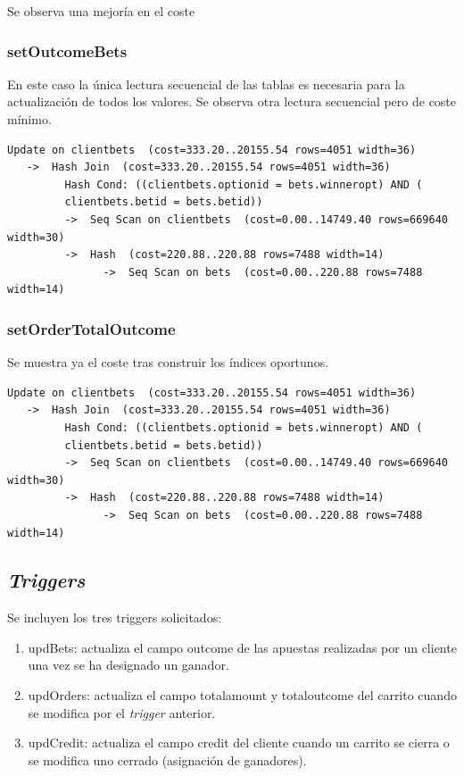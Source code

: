 \documentclass{article}
\begin{document}
Se observa una mejoría en el coste %

\subsubsection{setOutcomeBets}

En este caso la única lectura secuencial de las tablas es necesaria para la actualización de todos los valores. Se observa otra lectura secuencial pero de coste mínimo.

\begin{lstlisting}[style=sql]
 Update on clientbets  (cost=333.20..20155.54 rows=4051 width=36)
   ->  Hash Join  (cost=333.20..20155.54 rows=4051 width=36)
         Hash Cond: ((clientbets.optionid = bets.winneropt) AND (
         clientbets.betid = bets.betid))
         ->  Seq Scan on clientbets  (cost=0.00..14749.40 rows=669640 width=30)
         ->  Hash  (cost=220.88..220.88 rows=7488 width=14)
               ->  Seq Scan on bets  (cost=0.00..220.88 rows=7488 width=14)
\end{lstlisting}

\subsubsection{setOrderTotalOutcome}

Se muestra ya el coste tras construir los índices oportunos.
\begin{lstlisting}[style=sql]
 Update on clientbets  (cost=333.20..20155.54 rows=4051 width=36)
   ->  Hash Join  (cost=333.20..20155.54 rows=4051 width=36)
         Hash Cond: ((clientbets.optionid = bets.winneropt) AND (
         clientbets.betid = bets.betid))
         ->  Seq Scan on clientbets  (cost=0.00..14749.40 rows=669640 width=30)
         ->  Hash  (cost=220.88..220.88 rows=7488 width=14)
               ->  Seq Scan on bets  (cost=0.00..220.88 rows=7488 width=14)
\end{lstlisting}

\subsection{\textit{Triggers}}
Se incluyen los tres triggers solicitados:
\begin{enumerate}
    \item updBets: actualiza el campo outcome de las apuestas realizadas por un cliente una vez se ha designado un ganador.
    \item updOrders: actualiza el campo totalamount y totaloutcome del carrito cuando se modifica por el \textit{trigger} anterior.
    \item updCredit: actualiza el campo credit del cliente cuando un carrito se cierra o se modifica uno cerrado (asignación de ganadores).
\end{enumerate}
\end{document}
